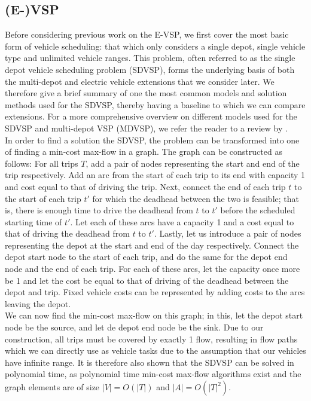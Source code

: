 \documentclass[]{article}
\begin{document}
\subsection{(E-)VSP}
Before considering previous work on the E-VSP, we first cover the most basic form of vehicle scheduling: that which only considers a single depot, single vehicle type and unlimited vehicle ranges. This problem, often referred to as the single depot vehicle scheduling problem (SDVSP), forms the underlying basis of both the multi-depot and electric vehicle extensions that we consider later. We therefore give a brief summary of one the most common models and solution methods used for the SDVSP, thereby having a baseline to which we can compare extensions. For a more comprehensive overview on different models used for the SDVSP and multi-depot VSP (MDVSP), we refer the reader to a review by \citet{Bunte2009}. \\
In order to find a solution the SDVSP, the problem can be transformed into one of finding a min-cost max-flow in a graph. The graph can be constructed as follows: For all trips $T$, add a pair of nodes representing the start and end of the trip respectively. Add an arc from the start of each trip to its end with capacity 1 and cost equal to that of driving the trip. Next, connect the end of each trip $t$ to the start of each trip $t'$ for which the deadhead between the two is feasible; that is, there is enough time to drive the deadhead from $t$ to $t'$ before the scheduled starting time of $t'$. Let each of these arcs have a capacity 1 and a cost equal to that of driving the deadhead from $t$ to $t'$. Lastly, let us introduce a pair of nodes representing the depot at the start and end of the day respectively. Connect the depot start node to the start of each trip, and do the same for the depot end node and the end of each trip. For each of these arcs, let the capacity once more be 1 and let the cost be equal to that of driving of the deadhead between the depot and trip. Fixed vehicle costs can be represented by adding costs to the arcs leaving the depot. \\
We can now find the min-cost max-flow on this graph; in this, let the depot start node be the source, and let de depot end node be the sink. Due to our construction, all trips must be covered by exactly 1 flow, resulting in flow paths which we can directly use as vehicle tasks due to the assumption that our vehicles have infinite range. It is therefore also shown that the SDVSP can be solved in polynomial time, as polynomial time min-cost max-flow algorithms exist and the graph elements are of size $|V| = O(|T|)$ and $|A| = O(|T|^2)$.\\ 
\end{document}
